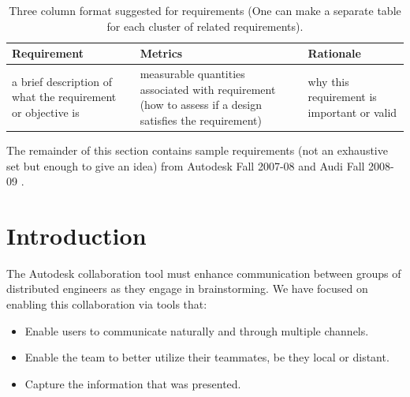 \begin{table}
\color{blue}
  \begin{tabular}{| p{44mm} | p{49mm} | p{42mm} |}   %
  \hline
  Requirement & Metrics & Rationale \\
  \hline
  a brief description of what the requirement or objective is & 
  measurable quantities associated with requirement (how to assess if a design satisfies the requirement) &
  why this requirement is important or valid \\

    \hline
  \end{tabular}
\caption[Three column requirements format]{Three column format suggested for requirements (One can make a separate table for each cluster of related requirements).}
	\label{threecolumnreqs}  %
\normalcolor
\end{table}

The remainder of this section contains sample requirements (not an exhaustive set but enough to give an idea) from Autodesk Fall 2007-08 \cite{Autodesk2008Fall} and Audi Fall 2008-09 \cite{Audi2009Fall}.


\section*{Introduction}

The Autodesk collaboration tool must enhance communication between groups of distributed engineers as they engage in brainstorming.  We have focused on enabling this collaboration via tools that:

\begin{itemize}\tightlist
\item Enable users to communicate naturally and through multiple channels.
\item Enable the team to better utilize their teammates, be they local or distant.
\item Capture the information that was presented.
\end{itemize}

